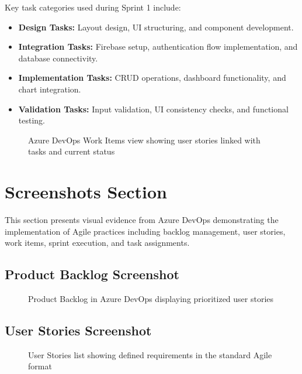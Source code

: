 \documentclass[12pt,a4paper]{article}
\begin{document}
Key task categories used during Sprint 1 include:
\begin{itemize}
    \item \textbf{Design Tasks:} Layout design, UI structuring, and component development.
    \item \textbf{Integration Tasks:} Firebase setup, authentication flow implementation, and database connectivity.
    \item \textbf{Implementation Tasks:} CRUD operations, dashboard functionality, and chart integration.
    \item \textbf{Validation Tasks:} Input validation, UI consistency checks, and functional testing.
\end{itemize}

\begin{figure}[H]
\centering
{}
\caption{Azure DevOps Work Items view showing user stories linked with tasks and current status}
\end{figure}


\section{Screenshots Section}
This section presents visual evidence from Azure DevOps demonstrating the implementation of Agile practices including backlog management, user stories, work items, sprint execution, and task assignments.

\subsection{Product Backlog Screenshot}
\begin{figure}[H]
\centering
{}
\caption{Product Backlog in Azure DevOps displaying prioritized user stories}
\end{figure}

\subsection{User Stories Screenshot}
\begin{figure}[H]
\centering
{}
\caption{User Stories list showing defined requirements in the standard Agile format}
\end{figure}
\end{document}
